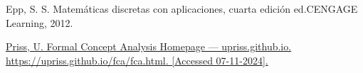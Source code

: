 \begin{thebibliography}{99}

  { Epp, S. S. Matemáticas discretas con aplicaciones, cuarta edición ed.CENGAGE Learning, 2012.}

  \href{https://upriss.github.io/fca/fca.html}{Priss, U. Formal Concept Analysis Homepage — upriss.github.io.
  https://upriss.github.io/fca/fca.html. [Accessed 07-11-2024].}
  
\end{thebibliography}
  